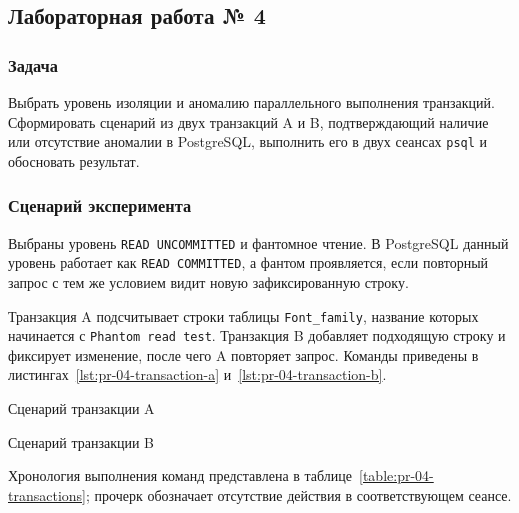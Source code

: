 \subsection{Лабораторная работа № 4}

\subsubsection{Задача}

Выбрать уровень изоляции и аномалию параллельного выполнения транзакций.
Сформировать сценарий из двух транзакций A и B, подтверждающий наличие или
отсутствие аномалии в PostgreSQL, выполнить его в двух сеансах
\texttt{psql} и обосновать результат.

\subsubsection{Сценарий эксперимента}

Выбраны уровень \texttt{READ UNCOMMITTED} и фантомное чтение. В
PostgreSQL данный уровень работает как \texttt{READ COMMITTED}, а
фантом проявляется, если повторный запрос с тем же условием видит новую
зафиксированную строку.

Транзакция A подсчитывает строки таблицы \texttt{Font_family},
название которых начинается с \texttt{Phantom read test}.
Транзакция B добавляет подходящую строку и фиксирует изменение, после чего A
повторяет запрос. Команды приведены в
листингах~\ref{lst:pr-04-transaction-a} и~\ref{lst:pr-04-transaction-b}.

{Сценарий транзакции A}
{\label{lst:pr-04-transaction-a}}

\clearpage
{}
{Сценарий транзакции B}
{\label{lst:pr-04-transaction-b}}

Хронология выполнения команд представлена в
таблице~\ref{table:pr-04-transactions}; прочерк обозначает отсутствие действия
в соответствующем сеансе.

